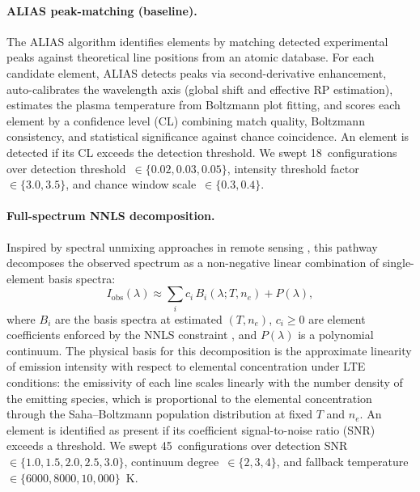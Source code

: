 \paragraph{ALIAS peak-matching (baseline).}
The ALIAS algorithm \citep{Labutin2013} identifies elements by matching detected experimental peaks against theoretical line positions from an atomic database.
For each candidate element, ALIAS detects peaks via second-derivative enhancement, auto-calibrates the wavelength axis (global shift and effective RP estimation), estimates the plasma temperature from Boltzmann plot fitting, and scores each element by a confidence level (CL) combining match quality, Boltzmann consistency, and statistical significance against chance coincidence.
An element is detected if its CL exceeds the detection threshold.
We swept 18~configurations over detection threshold~$\in \{0.02, 0.03, 0.05\}$, intensity threshold factor~$\in \{3.0, 3.5\}$, and chance window scale~$\in \{0.3, 0.4\}$.

\paragraph{Full-spectrum NNLS decomposition.}
Inspired by spectral unmixing approaches in remote sensing \citep{Wang2014,Lawson1974}, this pathway decomposes the observed spectrum as a non-negative linear combination of single-element basis spectra:
\begin{equation}
  I_\mathrm{obs}(\lambda) \approx \sum_i c_i \, B_i(\lambda; T, n_e) + P(\lambda),
  \label{eq:nnls}
\end{equation}
where $B_i$ are the basis spectra at estimated $(T, n_e)$, $c_i \geq 0$ are element coefficients enforced by the NNLS constraint \citep{Lawson1974}, and $P(\lambda)$ is a polynomial continuum.
The physical basis for this decomposition is the approximate linearity of emission intensity with respect to elemental concentration under LTE conditions: the emissivity of each line scales linearly with the number density of the emitting species, which is proportional to the elemental concentration through the Saha--Boltzmann population distribution at fixed $T$ and $n_e$.
An element is identified as present if its coefficient signal-to-noise ratio (SNR) exceeds a threshold.
We swept 45~configurations over detection SNR~$\in \{1.0, 1.5, 2.0, 2.5, 3.0\}$, continuum degree~$\in \{2, 3, 4\}$, and fallback temperature~$\in \{6000, 8000, 10{,}000\}$~K.


